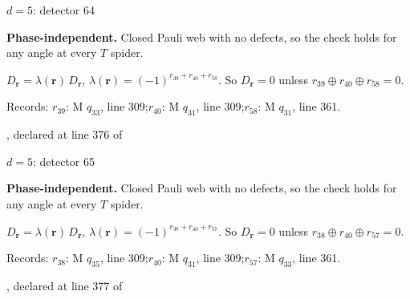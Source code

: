 \label{d5_det064}
{\Large $d=5$: detector 64}\par
\textbf{Phase-independent.} Closed Pauli web with no defects, so the check holds for any angle at every $T$ spider.
\begin{center}
\end{center}
\vspace{-1mm}
$D_{\boldsymbol r}=\lambda(\boldsymbol r)\,D_{\boldsymbol r}$, \quad $\lambda(\boldsymbol r)=(-1)^{r_{39}+r_{40}+r_{58}}$. \qquad So $D_{\boldsymbol r}=0$ unless $r_{39}\oplus r_{40}\oplus r_{58}=0$.
\par\smallskip\begin{minipage}{.98\linewidth}\small Records: $r_{39}$: M $q_{33}$, line 309;\quad $r_{40}$: M $q_{31}$, line 309;\quad $r_{58}$: M $q_{31}$, line 361.\end{minipage}
\vfill
{\footnotesize\texttt{}, declared at line 376 of \texttt{}}
\newpage

\label{d5_det065}
{\Large $d=5$: detector 65}\par
\textbf{Phase-independent.} Closed Pauli web with no defects, so the check holds for any angle at every $T$ spider.
\begin{center}
\end{center}
\vspace{-1mm}
$D_{\boldsymbol r}=\lambda(\boldsymbol r)\,D_{\boldsymbol r}$, \quad $\lambda(\boldsymbol r)=(-1)^{r_{38}+r_{40}+r_{57}}$. \qquad So $D_{\boldsymbol r}=0$ unless $r_{38}\oplus r_{40}\oplus r_{57}=0$.
\par\smallskip\begin{minipage}{.98\linewidth}\small Records: $r_{38}$: M $q_{35}$, line 309;\quad $r_{40}$: M $q_{31}$, line 309;\quad $r_{57}$: M $q_{33}$, line 361.\end{minipage}
\vfill
{\footnotesize\texttt{}, declared at line 377 of \texttt{}}
\newpage

